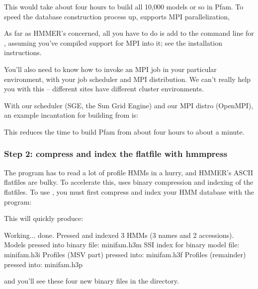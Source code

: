 
This would take about four hours to build all 10,000 models or so in
Pfam.  To speed the database construction process up, 
supports MPI parallelization,

As far as HMMER's concerned, all you have to do is add  to
the command line for , assuming you've compiled support
for MPI into it; see the installation instructions.

You'll also need to know how to invoke an MPI job in your particular
environment, with your job scheduler and MPI distribution. We can't
really help you with this -- different sites have different cluster
environments.

With our scheduler (SGE, the Sun Grid Engine) and our MPI distro
(OpenMPI), an example incantation for building  from
 is:


This reduces the time to build Pfam from about four hours to about a
minute.

\subsubsection{Step 2: compress and index the flatfile with hmmpress}

The  program has to read a lot of profile HMMs in a
hurry, and HMMER's ASCII flatfiles are bulky. To accelerate this,
 uses binary compression and indexing of the flatfiles.
To use , you must first compress and index your HMM
database with the  program:


This will quickly produce:

\begin{sreoutput}
Working...    done.
Pressed and indexed 3 HMMs (3 names and 2 accessions).
Models pressed into binary file:   minifam.h3m
SSI index for binary model file:   minifam.h3i
Profiles (MSV part) pressed into:  minifam.h3f
Profiles (remainder) pressed into: minifam.h3p
\end{sreoutput}

and you'll see these four new binary files in the directory. 


